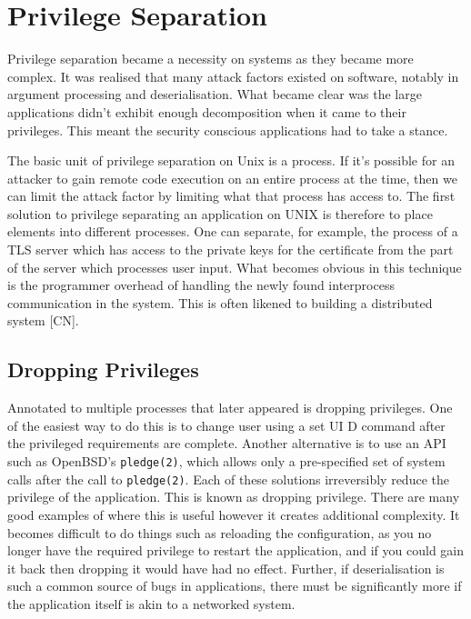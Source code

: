 \documentclass[sigplan]{acmart}
\begin{document}
\section{Privilege Separation}

Privilege separation became a necessity on systems as they became more complex. It was realised that many attack factors existed on software, notably in argument processing and deserialisation. What became clear was the large applications didn't exhibit enough decomposition when it came to their privileges. This meant the security conscious applications had to take a stance.

The basic unit of privilege separation on Unix is a process. If it's possible for an attacker to gain remote code execution on an entire process at the time, then we can limit the attack factor by limiting what that process has access to. The first solution to privilege separating an application on UNIX is therefore to place elements into different processes. One can separate, for example, the process of a TLS server which has access to the private keys for the certificate from the part of the server which processes user input. What becomes obvious in this technique is the programmer overhead of handling the newly found interprocess communication in the system. This is often likened to building a distributed system [CN].


\subsection{Dropping Privileges}

Annotated to multiple processes that later appeared is dropping privileges. One of the easiest way to do this is to change user using a set UI D command after the privileged requirements are complete. Another alternative is to use an API such as OpenBSD's \texttt{pledge(2)}, which allows only a pre-specified set of system calls after the call to \texttt{pledge(2)}. Each of these solutions irreversibly reduce the privilege of the application. This is known as dropping privilege. There are many good examples of where this is useful however it creates additional complexity. It becomes difficult to do things such as reloading the configuration, as you no longer have the required privilege to restart the application, and if you could gain it back then dropping it would have had no effect. Further, if deserialisation is such a common source of bugs in applications, there must be significantly more if the application itself is akin to a networked system.
\end{document}
